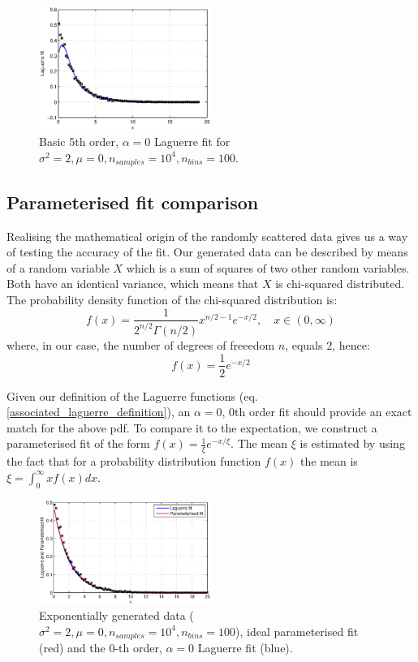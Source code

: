 \documentclass[a4paper]{article}
\numberwithin{equation}{section}
\begin{document}
\begin{figure}[!h]
\centering
\includegraphics[width=0.5\textwidth]{basic_fit.eps}
\caption{\label{fig:basicfit}Basic 5th order, $\alpha=0$ Laguerre fit for $\sigma^2=2, \mu=0, n_{samples}=10^4, n_{bins}=100$.}
\end{figure}

\subsection{Parameterised fit comparison}
Realising the mathematical origin of the randomly scattered data gives us a way of testing the accuracy of the fit. Our generated data can be described by means of a random variable $X$ which is a sum of squares of two other random variables. Both have an identical variance, which means that $X$ is chi-squared distributed. The probability density function of the chi-squared distribution is:
\begin{equation}
f(x) = \frac{1}{2^{n/2} \Gamma(n/2)}x^{n/2-1} e^{-x/2}, \quad x \in (0, \infty)
\end{equation}
where, in our case, the number of degrees of freeedom $n$, equals $2$, hence:
\begin{equation}
f(x) = \frac{1}{2} e^{-x/2}
\end{equation}

\noindent Given our definition of the Laguerre functions (eq. \ref{associated_laguerre_definition}), an $\alpha = 0$, 0th order fit should provide an exact match for the above pdf. To compare it to the expectation, we construct a parameterised fit of the form $f(x) = \frac{1}{\xi} e^{-x/\xi}$. The mean $\xi$ is estimated by using the fact that for a probability distribution function $f(x)$ the mean is $\xi = \int_{0}^{\infty} xf(x) dx$. \\

\begin{figure}[!h]
\centering
\includegraphics[width=0.5\textwidth]{laguerre_parameterised_fit.eps}
\caption{\label{fig:laguerreparemeterisedfit}Exponentially generated data ($\sigma^2=2, \mu=0, n_{samples}=10^4, n_{bins}=100$), ideal parameterised fit (red) and the 0-th order, $\alpha=0$ Laguerre fit (blue).}
\end{figure}
\end{document}
